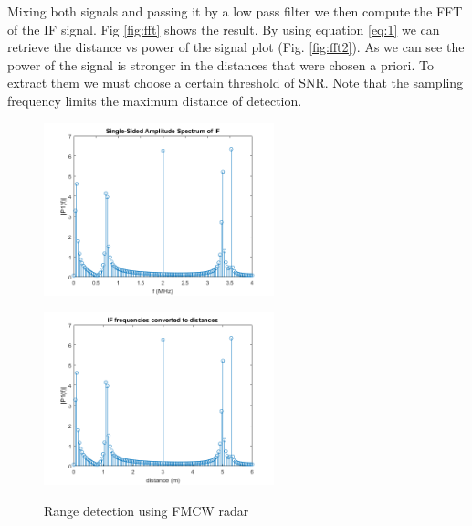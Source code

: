 Mixing both signals and passing it by a low pass filter we then compute the \ac{FFT} of the \ac{IF} signal. Fig \ref{fig:fft} shows the result. By using equation \ref{eq:1} we can retrieve the distance vs power of the signal plot (Fig. \ref{fig:fft2}). As we can see the power of the signal is stronger in the distances that were chosen a priori. To extract them we must choose a certain threshold of \ac{SNR}. Note that the sampling frequency limits the maximum distance of detection.
\begin{figure}[h] 
    \begin{minipage}[b]{.49\linewidth}
        \includegraphics[height=5cm,width=\linewidth]{imgs/chapter2/FFT.png}
        \label{fig:fft}
    \end{minipage}
    \begin{minipage}[b]{.49\linewidth}
        \includegraphics[height=5cm,width=\linewidth]{imgs/chapter2/distance.png}
        \label{fig:fft2}
    \end{minipage}
    \caption{Range detection using \ac{FMCW} \ac{radar}}
    \label{fig:distance determination}
\end{figure}



